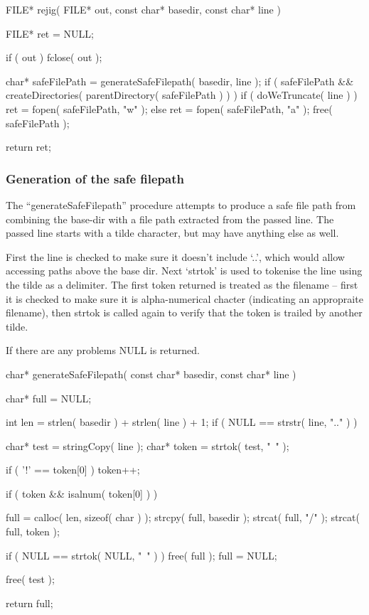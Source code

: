 \documentclass[]{article}
\begin{document}
\begin{verbatimtab}
FILE* rejig( FILE* out, const char* basedir, const char* line )
{
	FILE* ret = NULL;

	if ( out ) fclose( out );

	char* safeFilePath = generateSafeFilepath( basedir, line );
	if ( safeFilePath && createDirectories( parentDirectory( safeFilePath ) ) )
	{
		if ( doWeTruncate( line ) )
		{
			ret = fopen( safeFilePath, "w" );
		}
		else
		{
			ret = fopen( safeFilePath, "a" );
		}
	}
	free( safeFilePath );

	return ret;
}

\end{verbatimtab}
\subsubsection{			Generation of the safe filepath}

The ``generateSafeFilepath'' procedure attempts to produce a safe file path from combining the base-dir with a file path extracted from the passed line.
The passed line starts with a tilde character, but may have anything else as well.


First the line is checked to make sure it doesn't include `..', which would allow accessing paths above the base dir.
Next `strtok' is used to tokenise the line using the tilde as a delimiter.
The first token returned is treated as the filename -- first it is checked to make sure it is alpha-numerical chacter (indicating an appropraite filename), then strtok is called again to verify that the token is trailed by another tilde.


If there are any problems NULL is returned.

\begin{verbatimtab}

char* generateSafeFilepath( const char* basedir, const char* line )
{
	char* full = NULL;
	{
		int len = strlen( basedir ) + strlen( line ) + 1;
		if ( NULL == strstr( line, ".." ) )
		{
			char* test  = stringCopy( line );	
			char* token = strtok( test, "~" );

			if ( '!' == token[0] ) token++;

			if ( token && isalnum( token[0] ) )
			{
				full = calloc( len, sizeof( char ) );
				strcpy( full, basedir );
				strcat( full, "/" );
				strcat( full, token );

				if ( NULL == strtok( NULL, "~" ) )
				{
					free( full );
					full = NULL;
				}
			}
			free( test );
		}
	}
	return full;
}

\end{verbatimtab}
\end{document}
